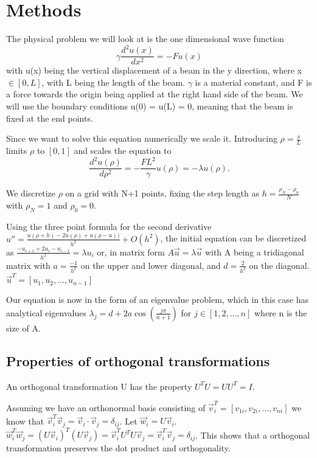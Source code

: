\section*{Methods}



The physical problem we will look at is the one dimensional wave function
\begin{equation}
\gamma \frac{d^2 u(x)}{dx^2} = -F u(x)
\end{equation}
with u(x) being the vertical displacement of a beam in the y direction, where
x $\in [0, L]$, with L being the length of the beam. $\gamma$ is a material constant,
and F is a force towards the origin being applied at the right hand side of the beam.
We will use the boundary conditions u(0) = u(L) = 0, meaning that the beam is
fixed at the end points.


Since we want to solve this equation numerically we scale it.
Introducing $ \rho = \frac{x}{L} $ limits $\rho$ to $[0, 1]$ and scales the
equation to
$$\frac{d^2 u(\rho)}{d\rho^2} = - \frac{FL^2}{\gamma} u(\rho) = -\lambda u(\rho).$$

We discretize $\rho$ on a grid with N+1 points, fixing the step length as $h = \frac{\rho_N - \rho_0}{N}$ with $\rho_N = 1$ and
$\rho_0 = 0$.

Using the three point formula for the second derivative $ u'' = \frac{u(\rho + h) - 2u(\rho) +
u(\rho -u))}{h^2} + O(h^2)$, the initial equation can be discretized as
$\frac{-u_{i+1} + 2u_i - u_{i-1}}{h^2} = \lambda u_i$
or, in matrix form
$ A \vec{u} = \lambda \vec{u}$
with A being a tridiagonal matrix with $a = \frac{-1}{h^2}$ on the upper and lower
diagonal, and $d = \frac{2}{h^2}$ on the diagonal. $\vec{u}^T = [u_1, u_2, ..., u_{n-1}]$

Our equation is now in the form of an eigenvalue problem, which in this case has
analytical eigenvalues $\lambda_j = d + 2a\cos{(\frac{j\pi}{n+1})}$ for $j \in
[1,2,...,n]$ where n is the size of A. \cite{lectures}

\subsection*{Properties of orthogonal transformations}

An orthogonal transformation U has the property $U^T U = U U^T = I$.

Assuming we have an orthonormal basis consisting of $\vec{v}_i^T = [v_{1i},
v_{2i}, ... , v_{ni}]$ we know that $\vec{v}_i^T \vec{v}_j = \vec{v}_i \cdot
\vec{v}_j = \delta_{ij}$. Let $\vec{w}_i = U\vec{v}_i$. $\vec{w}_i^T \vec{w}_j =
(U\vec{v}_i)^T(U\vec{v}_j) = \vec{v}_i^T U^T U \vec{v}_j = \vec{v}_i^T \vec{v}_j
= \delta_{ij}$. This shows that a orthogonal transformation preserves the dot
product and orthogonality.

